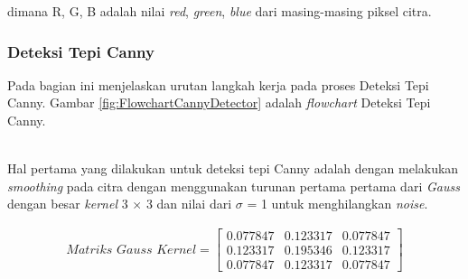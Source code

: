\noindent dimana R, G, B adalah nilai \textit{red}, \textit{green}, \textit{blue} dari masing-masing piksel citra.\\

\subsubsection{Deteksi Tepi Canny}
\noindent Pada bagian ini menjelaskan urutan langkah kerja pada proses Deteksi Tepi Canny. Gambar \ref{fig:FlowchartCannyDetector} adalah \textit{flowchart} Deteksi Tepi Canny.

\begin{adjustbox}{width=1\textwidth}
	\noindent\begin{minipage}{\linewidth}
		\label{fig:FlowchartCannyDetector}
	\end{minipage}
\end{adjustbox}\\

\noindent Hal pertama yang dilakukan untuk deteksi tepi Canny adalah dengan melakukan \textit{smoothing} pada citra dengan menggunakan turunan pertama pertama dari \textit{Gauss} dengan besar \textit{kernel} 3 $\times$ 3 dan nilai dari $\sigma$ = 1 untuk menghilangkan \textit{noise}.

\begin{gather}
\textit{Matriks Gauss Kernel}
=
\begin{bmatrix}
0.077847 & 0.123317 & 0.077847 \\
0.123317 & 0.195346	& 0.123317 \\
0.077847 & 0.123317 & 0.077847
\end{bmatrix}
\label{eq:MatriksGaussKernel}
\end{gather} 

